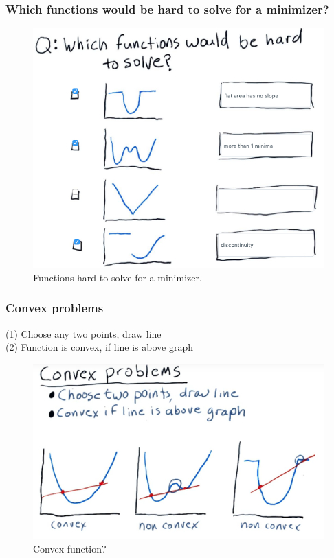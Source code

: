 \documentclass[12pt]{article}
\begin{document}
\subsubsection{Which functions would be hard to solve for a minimizer?} 
\begin{figure}[!ht]
\centering
\includegraphics[scale=0.35]{fig/fig21}
\caption{Functions hard to solve for a minimizer.}
\end{figure}
 
\subsubsection{Convex problems} 
(1) Choose any two points, draw line \\
(2) Function is convex, if line is above graph 
\begin{figure}[!ht]
\centering
\includegraphics[scale=0.4]{fig/fig22}
\caption{Convex function?}
\end{figure}
\end{document}
